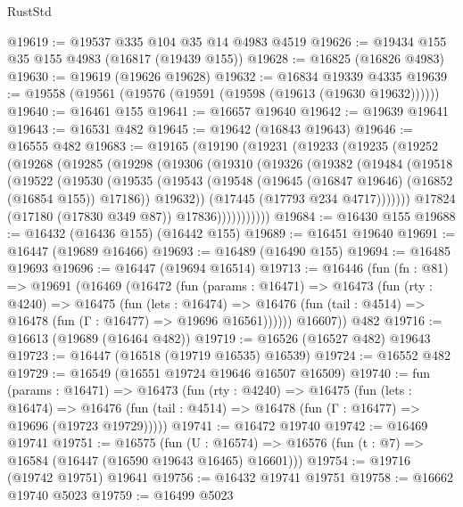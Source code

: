 \begin{lexlean}{RustStd}
\begin{coremodule}
{\begin{coremodule}
{{{{{{{{{{{{{{{{{{{{{{{{{{{{{{{{{{{{{{{{{{{{{{{{{{{{{{{@19619 := @19537 @335 @104 @35 @14 @4983 @4519
@19626 := @19434 @155 @35 @155 @4983 (@16817 (@19439 @155))
@19628 := @16825 (@16826 @4983)
@19630 := @19619 (@19626 @19628)
@19632 := @16834 @19339 @4335
@19639 := @19558 (@19561 (@19576 (@19591 (@19598 (@19613 (@19630 @19632))))))
@19640 := @16461 @155
@19641 := @16657 @19640
@19642 := @19639 @19641
@19643 := @16531 @482
@19645 := @19642 (@16843 @19643)
@19646 := @16555 @482
@19683 := @19165
    (@19190
      (@19231
        (@19233
          (@19235
            (@19252
              (@19268
                (@19285
                  (@19298
                    (@19306
                      (@19310
                        (@19326
                          (@19382
                            (@19484
                              (@19518
                                (@19522
                                  (@19530
                                    (@19535
                                      (@19543
                                        (@19548
                                          (@19645 (@16847 @19646) (@16852 (@16854 @155)) @17186))
                                        @19632))
                                    (@17445 (@17793 @234 @4717)))))))
                          @17824
                          (@17180 (@17830 @349 @87))
                          @17836)))))))))))
@19684 := @16430 @155
@19688 := @16432 (@16436 @155) (@16442 @155)
@19689 := @16451 @19640
@19691 := @16447 (@19689 @16466)
@19693 := @16489 (@16490 @155)
@19694 := @16485 @19693
@19696 := @16447 (@19694 @16514)
@19713 := @16446
    (fun (fn : @81) =>
    @19691
      (@16469
        (@16472
          (fun (params : @16471) =>
          @16473
            (fun (rty : @4240) =>
            @16475
              (fun (lets : @16474) =>
              @16476 (fun (tail : @4514) => @16478 (fun (Γ : @16477) => @19696 @16561))))))
        @16607))
    @482
@19716 := @16613 (@19689 (@16464 @482))
@19719 := @16526 (@16527 @482) @19643
@19723 := @16447 (@16518 (@19719 @16535) @16539)
@19724 := @16552 @482
@19729 := @16549 (@16551 @19724 @19646 @16507 @16509)
@19740 := fun (params : @16471) =>
  @16473
    (fun (rty : @4240) =>
    @16475
      (fun (lets : @16474) =>
      @16476 (fun (tail : @4514) => @16478 (fun (Γ : @16477) => @19696 (@19723 @19729)))))
@19741 := @16472 @19740
@19742 := @16469 @19741
@19751 := @16575
    (fun (U : @16574) => @16576 (fun (t : @7) => @16584 (@16447 (@16590 @19643 @16465) @16601)))
@19754 := @19716 (@19742 @19751) @19641
@19756 := @16432 @19741 @19751
@19758 := @16662 @19740 @5023
@19759 := @16499 @5023
}}}}}}}}}}}}}}}}}}}}}}}}}}}}}}}}}}}}}}}}}}}}}}}}}}}}}}}
\end{coremodule}}
\end{coremodule}
\end{lexlean}
